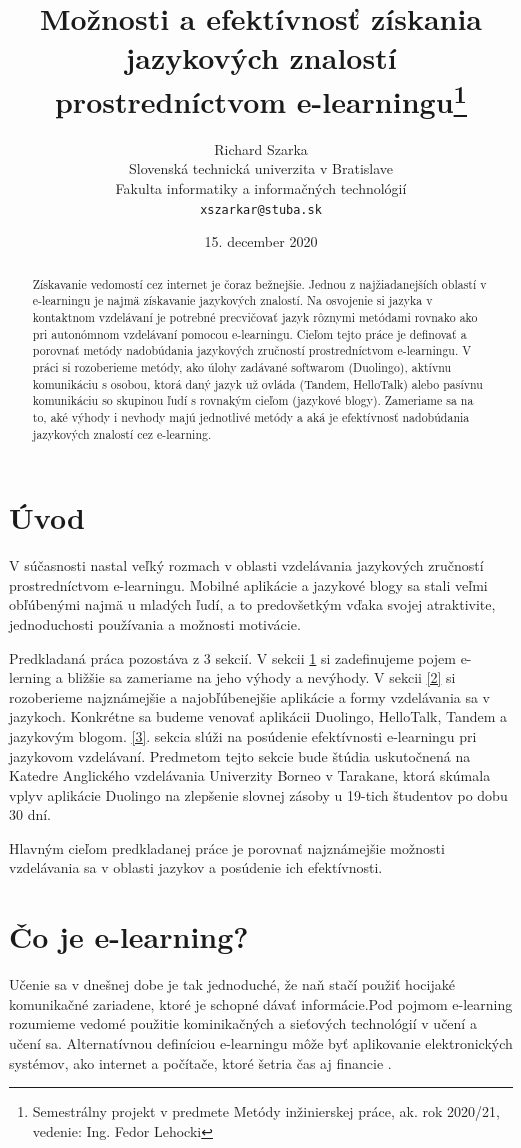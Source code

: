 \documentclass[10pt,oneside,slovak,a4paper]{article}
\title{Možnosti a efektívnosť získania jazykových znalostí prostredníctvom
e-learningu\thanks{Semestrálny projekt v predmete Metódy inžinierskej práce, ak. rok 2020/21, vedenie: Ing. Fedor Lehocki }} %
\author{Richard Szarka\\[2pt]
	{\small Slovenská technická univerzita v Bratislave}\\
	{\small Fakulta informatiky a informačných technológií}\\
	{\small \texttt{xszarkar@stuba.sk}}
	}
\date{\small 15. december 2020} %
\begin{document}
\maketitle

\begin{abstract}
Získavanie vedomostí cez internet je čoraz bežnejšie. Jednou z najžiadanejších oblastí v e-learningu je najmä získavanie jazykových znalostí. Na osvojenie si jazyka v kontaktnom vzdelávaní je potrebné precvičovať jazyk rôznymi metódami rovnako ako pri autonómnom vzdelávaní pomocou e-learningu. Cieľom tejto práce je definovať a porovnať metódy nadobúdania jazykových zručností prostredníctvom e-learningu. V práci si rozoberieme metódy, ako úlohy zadávané softwarom (Duolingo), aktívnu komunikáciu s osobou, ktorá daný jazyk už ovláda (Tandem, HelloTalk) alebo pasívnu komunikáciu so skupinou ľudí s rovnakým cieľom (jazykové blogy). Zameriame sa na to, aké výhody i nevhody majú jednotlivé metódy a aká je efektívnosť nadobúdania jazykových znalostí cez e-learning.
\end{abstract}

\section*{Úvod} %
V súčasnosti nastal veľký rozmach v oblasti vzdelávania jazykových zručností prostredníctvom e-learningu. Mobilné aplikácie a jazykové blogy sa stali veľmi obľúbenými najmä u mladých ľudí, a to predovšetkým vďaka svojej atraktivite, jednoduchosti používania a možnosti motivácie.

Predkladaná práca pozostáva z 3 sekcií. V sekcii \ref{1} si zadefinujeme pojem e-lerning a bližšie sa zameriame na jeho výhody a nevýhody. V sekcii \ref{2} si rozoberieme najznámejšie a najobľúbenejšie aplikácie a formy vzdelávania sa v jazykoch. Konkrétne sa budeme venovať aplikácii Duolingo, HelloTalk, Tandem a jazykovým blogom. \ref{3}. sekcia slúži na posúdenie efektívnosti  e-learningu pri jazykovom vzdelávaní. Predmetom tejto sekcie bude štúdia uskutočnená na Katedre Anglického vzdelávania Univerzity Borneo v Tarakane, ktorá skúmala vplyv aplikácie Duolingo na zlepšenie slovnej zásoby u 19-tich študentov po dobu 30 dní.

Hlavným cieľom predkladanej práce je porovnať najznámejšie možnosti vzdelávania sa v oblasti jazykov a posúdenie ich efektívnosti.

\section{Čo je e-learning?}%
\label{1}
Učenie sa v dnešnej dobe je tak jednoduché, že naň stačí použiť hocijaké komunikačné zariadene, ktoré je schopné dávať informácie\cite{vyhody}.Pod pojmom e-learning rozumieme vedomé použitie kominikačných a sieťových technológií v učení a učení sa. Alternatívnou definíciou e-learningu môže byť aplikovanie elektronických systémov, ako internet a počítače, ktoré šetria čas aj financie \cite{efektivnost}. 
\end{document}
